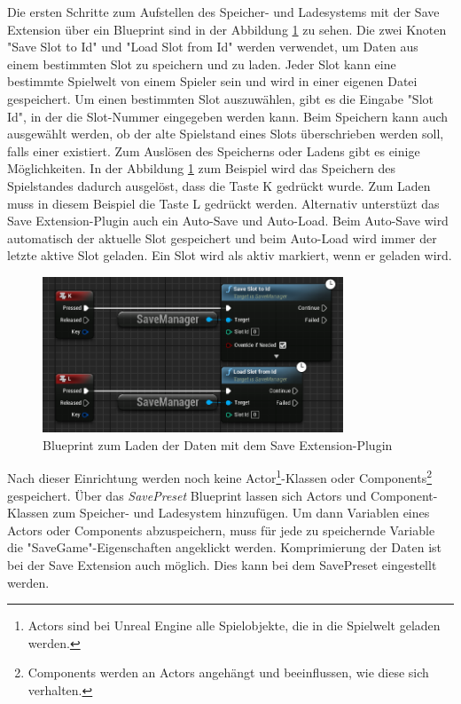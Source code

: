 Die ersten Schritte zum Aufstellen des Speicher- und Ladesystems mit der Save Extension über ein Blueprint sind in der Abbildung \ref{fig:unrealSaveExtensionBlueprint} zu sehen. Die zwei Knoten "Save Slot to Id" und "Load Slot from Id" werden verwendet, um Daten aus einem bestimmten Slot zu speichern und zu laden. Jeder Slot kann eine bestimmte Spielwelt von einem Spieler sein und wird in einer eigenen Datei gespeichert.\cite{piperiftPiperiftSaveSlot} Um einen bestimmten Slot auszuwählen, gibt es die Eingabe "Slot Id", in der die Slot-Nummer eingegeben werden kann. Beim Speichern kann auch ausgewählt werden, ob der alte Spielstand eines Slots überschrieben werden soll, falls einer existiert. Zum Auslösen des Speicherns oder Ladens gibt es einige Möglichkeiten. In der Abbildung \ref{fig:unrealSaveExtensionBlueprint} zum Beispiel wird das Speichern des Spielstandes dadurch ausgelöst, dass die Taste K gedrückt wurde. Zum Laden muss in diesem Beispiel die Taste L gedrückt werden. Alternativ unterstüzt das Save Extension-Plugin auch ein Auto-Save und Auto-Load. Beim Auto-Save wird automatisch der aktuelle Slot gespeichert und beim Auto-Load wird immer der letzte aktive Slot geladen. Ein Slot wird als aktiv markiert, wenn er geladen wird.\cite{piperiftPiperiftSaveSlot}\cite{piperiftPiperiftSaveBlueprint} 

\begin{figure}[htp]
    \centering
    \includegraphics[width=0.8\textwidth]{images/SaveExtension_load_save_blueprint.png}
    \caption{Blueprint zum Laden der Daten mit dem Save Extension-Plugin \cite{piperiftPiperiftSaveBlueprint}}
    \label{fig:unrealSaveExtensionBlueprint}
\end{figure}

Nach dieser Einrichtung werden noch keine Actor\footnote{Actors sind bei Unreal Engine alle Spielobjekte, die in die Spielwelt geladen werden.\cite{unrealengineActors}}-Klassen oder Components\footnote{Components werden an Actors angehängt und beeinflussen, wie diese sich verhalten.\cite{unrealengineActors}} gespeichert. Über das \textit{SavePreset} Blueprint lassen sich Actors und Component-Klassen zum Speicher- und Ladesystem hinzufügen. Um dann Variablen eines Actors oder Components abzuspeichern, muss für jede zu speichernde Variable die "SaveGame"-Eigenschaften angeklickt werden. Komprimierung der Daten ist bei der Save Extension auch möglich. Dies kann bei dem SavePreset eingestellt werden.

